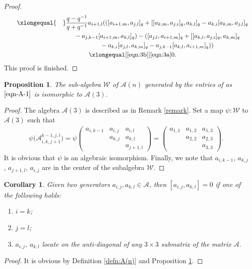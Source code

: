 \documentclass[pdftex]{sigma}
\numberwithin{equation}{section}
\def\A{\mathscr{A}}
\newtheorem{Corollary}[Theorem]{Corollary}
\newtheorem{Proposition}[Theorem]{Proposition}
 { \theoremstyle{definition}
\newtheorem{Definition}[Theorem]{Definition}
\newtheorem{Note}[Theorem]{Note}
\newtheorem{Example}[Theorem]{Example}
\newtheorem{Remark}[Theorem]{Remark} }
\begin{document}
\begin{proof}
\begin{gather*}
\qquad \xlongequal{\quad} \frac{q-q^{-1}}{q+q^{-1}}a_{i+1,l} ( ( [a_{i+1,m}, a_{j,l} ]_q+ [ [a_{k,m}, a_{j,i} ]_q,a_{k,l} ]_q- a_{k,i} [a_{k,m}, a_{j,l} ]_q \\
 \phantom{\qquad \xlongequal{\quad}}{} -a_{j,k-1} [a_{i+1,m}, a_{k,l} ]_q )- ( [a_{j,l}, a_{i+1,m} ]_q+ [ [a_{k,l}, a_{j,i} ]_q,a_{k,m} ]_q
\\
 \phantom{\qquad \xlongequal{\quad}}{} -a_{k,i} [a_{j,l}, a_{k,m} ]_q-a_{j,k-1} [a_{k,l}, a_{i+1,m} ]_q ) )\\
\qquad \xlongequal[\eqref{eqn:3b}]{\eqref{eqn:3a}} 0.
\end{gather*}
This proof is finished.
\end{proof}
\begin{Proposition}\label{prop:3}
The sub-algebra $\mathcal{W}$ of $\A(n)$ generated by the entries of \smash{$\A_{i,k,j+1}^{k-1,j,l}$} as $\eqref{eqn-A-1}$ is isomorphic to $\A(3)$.
\end{Proposition}
\begin{proof}
The algebra $\A(3)$ is described as in Remark \ref{remark}.
Set a map $\psi\colon\mathcal{W}$ to $\A(3)$ such that
\begin{gather*}
\psi\bigl(\A_{i,k,j+1}^{k-1,j,l}\bigr)=\psi\begin{pmatrix}
a_{i,k-1}& a_{i,j}&a_{i,l}\\
& a_{k,j}&a_{k,l}\\
& &a_{j+1,l}
\end{pmatrix}
=\begin{pmatrix}
a_{1,1}& a_{1,2}&a_{1,3}\\
& a_{2,2}&a_{2,3}\\
& &a_{3,3}
\end{pmatrix}.
\end{gather*}
It is obvious that $\psi$ is an algebraic isomorphism.
Finally, we note that $a_{i,k-1}$, $a_{k,j}$, $a_{j+1,l}$, $a_{i,j}$ are in the center of the subalgebra $\mathcal{W}$.
\end{proof}
\begin{Corollary}\label{cor:comm}
Given two generators $a_{i,j}, a_{k,l} \in \A$, then $[a_{i,j}, a_{k,l}]=0$ if one of the following holds:
\begin{enumerate}\itemsep=0pt
 \item[$(1)$] $i = k$;
 \item[$(2)$] $j = l$;
 \item[$(3)$] $a_{i,j}$, $a_{k,l}$ locate on the anti-diagonal of any $3\times 3$ submatrix of the matrix $\A.$
\end{enumerate}
\end{Corollary}
\begin{proof}
It is obvious by Definition \ref{defn:A(n)} and Proposition \ref{prop:3}.
\end{proof}
\end{document}
